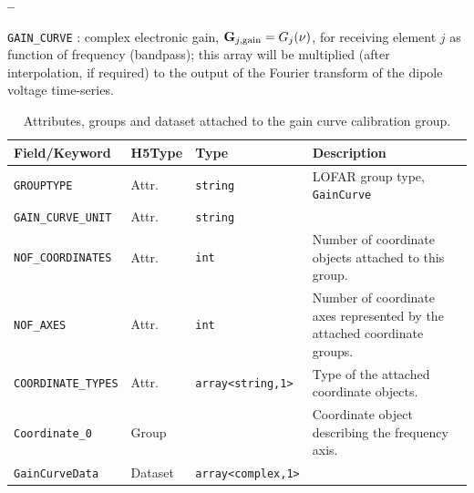 \documentclass[a4paper,10pt,bibtotoc]{scrartcl}
\begin{document}
\begin{list}{\textbf{--}}{}
\item \verb|GAIN_CURVE| : complex electronic gain, $\mathbf G_{j,\rm gain} = G_{j}(\nu)$,
  for receiving element $j$ as function of frequency (bandpass); this array
  will be multiplied (after interpolation, if required) to the output of the
  Fourier transform of the dipole voltage time-series.

 \begin{table}[ht]
    \centering
    \begin{tabular}{|lllp{6cm}|}
      \hline
      \sc Field/Keyword & \sc H5Type & \sc Type & Description \\
      \hline \hline
      \verb|GROUPTYPE|        & Attr. & \verb|string| & LOFAR group type,
      \verb|GainCurve| \\
      \verb|GAIN_CURVE_UNIT|  & Attr. & \verb|string|          &  \\
      \verb|NOF_COORDINATES|  & Attr. & \verb|int|             &
      Number of coordinate objects attached to this group. \\
      \verb|NOF_AXES|         & Attr. & \verb|int|             &
      Number of coordinate axes represented by the attached coordinate
      groups. \\
      \verb|COORDINATE_TYPES| & Attr. & \verb|array<string,1>| & Type
      of the attached coordinate objects. \\
      \hline 
      \verb|Coordinate_0|      & Group   &             & Coordinate
      object describing the frequency axis. \\
      \verb|GainCurveData|  & Dataset & \verb|array<complex,1>| &  \\
      \hline
    \end{tabular}
    \caption{Attributes, groups and dataset attached to the gain curve
      calibration group.}
    \label{tab:gain curve group}
  \end{table}
  {\small
}
\end{list}
\end{document}
